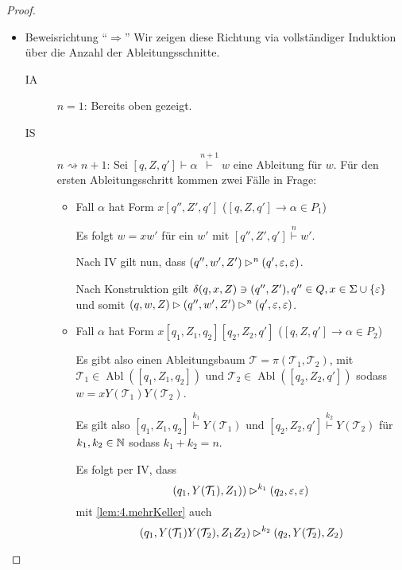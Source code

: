 \begin{proof}
    \begin{itemize}
     \item Beweisrichtung ``$\Rightarrow$''
     Wir zeigen diese Richtung via vollständiger Induktion über die Anzahl der Ableitungsschnitte.
     \begin{description}
      \item[IA] $n=1$: Bereits oben gezeigt.
      \item[IS] $n\rightsquigarrow n+1$:
      Sei $[q,Z,q']\vdash\alpha\stackrel{n+1}{\vdash} w$ eine Ableitung für $w$. Für den ersten Ableitungsschritt kommen zwei Fälle in Frage:
      \begin{itemize}
      \item Fall $\alpha$ hat Form $x[q'', Z', q']$ ($[q,Z,q']\rightarrow\alpha \in P_1$)
      
	  Es folgt $w = xw'$ für ein $w'$ mit $[q'', Z', q']\stackrel{n}{\vdash} w'$.
	  
	  Nach IV gilt nun, dass $(q'', w', Z') \rhd^n (q',\varepsilon,\varepsilon)$.
	  
	  Nach Konstruktion gilt $\delta(q, x, Z) \ni (q'', Z'), q'' \in Q, x \in \Sigma \cup \{\varepsilon\}$ und somit
	  $(q, w, Z) \rhd (q'', w', Z') \rhd^n (q',\varepsilon,\varepsilon)$.
      \item Fall $\alpha$ hat Form $x[q_1,Z_1,q_2][q_2, Z_2, q']$ ($[q,Z,q']\rightarrow\alpha \in P_2$)
      
      Es gibt also einen Ableitungsbaum $\mathcal{T} = \pi(\mathcal{T}_1,\mathcal{T}_2)$, mit $\mathcal{T}_1 \in \operatorname{Abl}([q_1, Z_1, q_2])$ und $\mathcal{T}_2 \in \operatorname{Abl}([q_2, Z_2, q'])$ sodass $w = xY(\mathcal{T}_1)Y(\mathcal{T}_2)$.
      
      Es gilt also $[q_1, Z_1, q_2]\stackrel{k_1}{\vdash} Y(\mathcal{T}_1)$ und 
      $[q_2, Z_2, q']\stackrel{k_2}{\vdash} Y(\mathcal{T}_2)$ für $k_1,k_2\in\mathbb{N}$ sodass $k_1+k_2=n$.
      
          Es folgt per IV, dass
          \begin{displaymath}
            (q_1, Y(\mathcal{T}_1), Z_1)) \rhd^{k_1} (q_2, \varepsilon, \varepsilon)
          \end{displaymath}
          mit \autoref{lem:4.mehrKeller} auch
          \begin{displaymath}
            (q_1, Y(\mathcal{T}_1)Y(\mathcal{T}_2), Z_1Z_2) \rhd^{k_2} (q_2, Y(\mathcal{T}_2), Z_2)
          \end{displaymath}
          


\end{itemize}
\end{description}
\end{itemize}
\end{proof}
